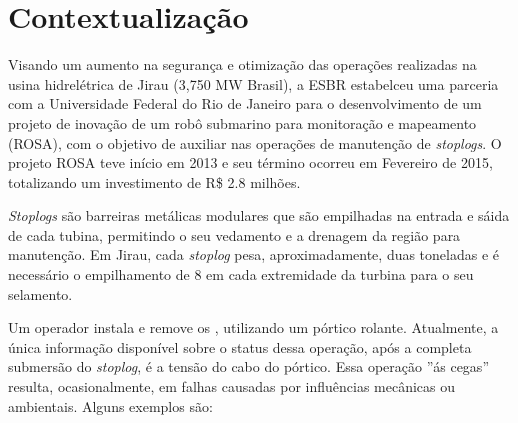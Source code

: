 \section{Contextualização}
Visando um aumento na segurança e otimização das operações realizadas na usina 
hidrelétrica de Jirau (3,750 MW Brasil), a ESBR estabelceu uma parceria com a 
Universidade Federal do Rio de Janeiro para o desenvolvimento de um projeto de 
inovação de um robô submarino para monitoração e mapeamento (ROSA), com o
objetivo de auxiliar nas operações de manutenção de \textit{stoplogs}. O projeto
ROSA teve início em 2013 e seu término ocorreu em Fevereiro de 2015, totalizando
um investimento de R\$ 2.8 milhões.

\textit{Stoplogs} são barreiras metálicas modulares que são empilhadas na
entrada e sáida de cada tubina, permitindo o seu vedamento e a drenagem da
região para manutenção. Em Jirau, cada \textit{stoplog} pesa, aproximadamente,
duas toneladas e é necessário o empilhamento de 8  em cada extremidade
da turbina para o seu selamento.

Um operador instala e remove os , utilizando um pórtico
rolante. Atualmente, a única informação disponível sobre o status dessa
operação, após a completa submersão do \textit{stoplog}, é a tensão do cabo do
pórtico. Essa operação ''ás cegas'' resulta, ocasionalmente, em falhas causadas 
por influências mecânicas ou ambientais. Alguns exemplos são:

